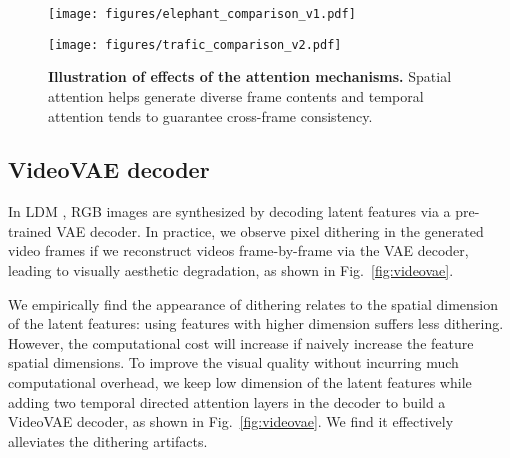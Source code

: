 \documentclass[10pt,twocolumn,letterpaper]{article}
\begin{document}
\begin{figure*}[t] 
\small
\centering
    \begin{minipage}{0.52\linewidth}
        \centering
\texttt{[image: figures/elephant\_comparison\_v1.pdf]}


    \end{minipage}\hfill
    \begin{minipage}{0.46\linewidth}
        \centering
        \texttt{[image: figures/trafic\_comparison\_v2.pdf]}
\end{minipage}\hfill
    \vspace{-3mm}
\caption{\textbf{Illustration of effects of the attention mechanisms.} Spatial attention helps generate diverse frame contents and temporal attention  tends to guarantee cross-frame consistency. 
}
\vspace{-3mm}
\label{fig:spatiotemporal}
\end{figure*}









\subsection{VideoVAE decoder}
\label{subsec:video_decoder}
In  LDM \cite{rombach_high-resolution_2022}, RGB images are synthesized by decoding latent features via a pre-trained VAE decoder. In practice, we observe pixel dithering   in the generated video frames if we reconstruct videos frame-by-frame via the VAE decoder, leading to visually aesthetic degradation, as shown in Fig.~\ref{fig:videovae}. 

We empirically find the appearance  of dithering   relates to the spatial dimension of the latent features:  using  features with higher   dimension suffers   less     dithering. However, the computational cost will increase if naively increase  the feature spatial dimensions. To improve the visual quality without incurring  much computational overhead, we keep   low dimension of the latent features while adding two   temporal directed attention layers in the decoder   to build a VideoVAE decoder, as shown in Fig.~\ref{fig:videovae}.  We find it effectively alleviates the dithering artifacts. 
\end{document}
